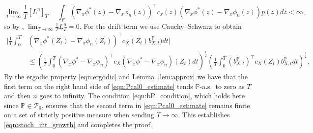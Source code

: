 \documentclass{article}
\makeatletter
\theoremstyle{plain}
\theoremstyle{definition}
\renewcommand{\P}{\mathbb{P}}
\newcommand{\Pcal}{{\mathcal P}}
\numberwithin{lem}{section}
\renewenvironment{proof}[1][\proofname] {\par\pushQED{\qed}\normalfont\topsep6\p@\@plus6\p@\relax\trivlist\item[\hskip\labelsep\bfseries#1\@addpunct{.}]\ignorespaces}{\popQED\endtrivlist\@endpefalse}
\makeatother
\begin{document}
\begin{proof}[Proof of Theorem~\ref{thm:main}]
\[\lim_{T \to \infty}\frac{1}{T}[L^n]_T = \int_F (\nabla_x \phi^*(z) - \nabla_x \phi_n(z))^\top c_x(z)(\nabla_x \phi^*(z) -\nabla_x \phi_n(z))p(z)dz < \infty,\]
so by \cite[Lemma~1.3.2]{fernholz2002stochastic}, $\lim_{T \to \infty} \frac{1}{T}L^n_T = 0$. For the drift term we use Cauchy--Schwarz to obtain
\begin{align}\bigg|\frac{1}{T}\int_0^T & (\nabla_x\phi^*(Z_t)-\nabla_x \phi_n(Z_t))^\top c_X(Z_t) b^\P_{X,t})dt\bigg| \\&  \leq \left(\frac{1}{T}\int_0^T(\nabla_x \phi^* - \nabla_x \phi_n)^\top c_X(\nabla_x \phi^*-\nabla_x \phi_n)(Z_t)dt\right)^{\frac{1}{2}} \left(\frac{1}{T}\int_0^T (b_{X,t}^\P)^\top c_X(Z_t)b_{X,t}^\P dt\right)^{\frac{1}{2}} \label{eqn:Pcal0_estimate}.
\end{align}
By the ergodic property \eqref{eqn:ergodic} and Lemma~\ref{lem:approx} we have that the first term on the right hand side of \eqref{eqn:Pcal0_estimate} tends $\P$-a.s.\ to zero as $T$ and then $n$ goes to infinity. The condition \eqref{eqn:bP_condition}, which holds here since $\P \in \Pcal_0$, ensures that the second term in \eqref{eqn:Pcal0_estimate} remains finite on a set of strictly positive measure when sending $T \to \infty$. This establishes \eqref{eqn:stoch_int_growth} and completes the proof. 
\end{proof}



\end{document}
